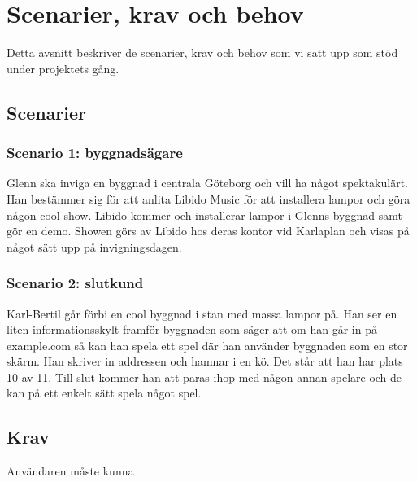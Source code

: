 \documentclass[a4paper,11pt]{article}
\begin{document}
\section{Scenarier, krav och behov}

  Detta avsnitt beskriver de scenarier, krav och behov som vi satt upp som
  stöd under projektets gång.

\subsection{Scenarier}

\subsubsection*{Scenario 1: byggnadsägare}

  Glenn ska inviga en byggnad i centrala Göteborg och vill ha något spektakulärt.
  Han bestämmer sig för att anlita Libido Music för att installera lampor och
  göra någon cool show. Libido kommer och installerar lampor i Glenns byggnad
  samt gör en demo. Showen görs av Libido hos deras kontor vid Karlaplan och
  visas på något sätt upp på invigningsdagen.

\subsubsection*{Scenario 2: slutkund}
  Karl-Bertil går förbi en cool byggnad i stan med massa lampor på. Han ser en
  liten informationsskylt framför byggnaden som säger att om han går in på
  example.com så kan han spela ett spel där han använder byggnaden som en stor
  skärm. Han skriver in addressen och hamnar i en kö. Det står att han har plats
  10 av 11.  Till slut kommer han att paras ihop med någon annan spelare och de
  kan på ett enkelt sätt spela något spel.


\subsection{Krav}

  Användaren måste kunna
\end{document}
